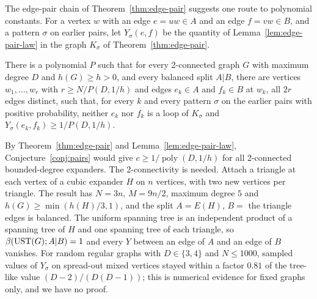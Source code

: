 The edge-pair chain of Theorem~\ref{thm:edge-pair} suggests one route to polynomial constants. For a vertex $w$ with an edge $e=uw\in A$ and an edge $f=vw\in B$, and a pattern $\sigma$ on earlier pairs, let $Y_\sigma(e,f)$ be the quantity of Lemma~\ref{lem:edge-pair-law} in the graph $K_\sigma$ of Theorem~\ref{thm:edge-pair}.

\begin{conjecture}\label{conj:pairs}
There is a polynomial $P$ such that for every 2-connected graph $G$ with maximum degree $D$ and $h(G)\ge h>0$, and every balanced split $A|B$, there are vertices $w_1,\dots,w_r$ with $r\ge N/P(D,1/h)$ and edges $e_k\in A$ and $f_k\in B$ at $w_k$, all $2r$ edges distinct, such that, for every $k$ and every pattern $\sigma$ on the earlier pairs with positive probability, neither $e_k$ nor $f_k$ is a loop of $K_\sigma$ and $Y_\sigma(e_k,f_k)\ge1/P(D,1/h)$.
\end{conjecture}

By Theorem~\ref{thm:edge-pair} and Lemma~\ref{lem:edge-pair-law}, Conjecture~\ref{conj:pairs} would give $c\ge1/\operatorname{poly}(D,1/h)$ for all 2-connected bounded-degree expanders. The 2-connectivity is needed. Attach a triangle at each vertex of a cubic expander $H$ on $n$ vertices, with two new vertices per triangle. The result has $N=3n$, $M=9n/2$, maximum degree $5$ and $h(G)\ge\min(h(H)/3,1)$, and the split $A=E(H)$, $B=$ the triangle edges is balanced. The uniform spanning tree is an independent product of a spanning tree of $H$ and one spanning tree of each triangle, so $\beta(\mathrm{UST}(G);A|B)=1$ and every $Y$ between an edge of $A$ and an edge of $B$ vanishes. For random regular graphs with $D\in\{3,4\}$ and $N\le1000$, sampled values of $Y_\sigma$ on spread-out mixed vertices stayed within a factor $0.81$ of the tree-like value $(D-2)/(D(D-1))$; this is numerical evidence for fixed graphs only, and we have no proof.
